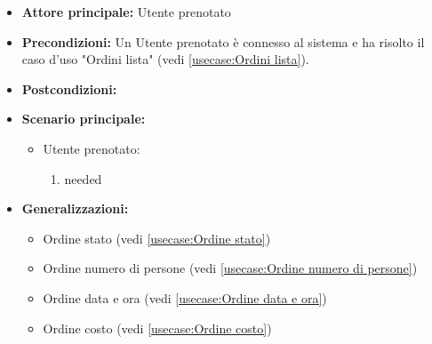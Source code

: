 \label{usecase:Ordine dettaglio}
\begin{itemize}
\item \textbf{Attore principale:} Utente prenotato
\item \textbf{Precondizioni:}
Un Utente prenotato è connesso al sistema e ha risolto il caso d'uso "Ordini lista" (vedi \autoref{usecase:Ordini lista}).
\item \textbf{Postcondizioni:}
\item \textbf{Scenario principale:}
\begin{itemize}
\item Utente prenotato:
\begin{enumerate}
\item needed
\end{enumerate}
\end{itemize}
\item \textbf{Generalizzazioni:}
\begin{itemize}
\item Ordine stato (vedi \autoref{usecase:Ordine stato})\item Ordine numero di persone (vedi \autoref{usecase:Ordine numero di persone})\item Ordine data e ora (vedi \autoref{usecase:Ordine data e ora})\item Ordine costo (vedi \autoref{usecase:Ordine costo})
\end{itemize}
\end{itemize}